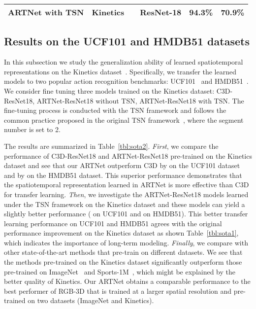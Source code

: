 \documentclass[10pt,twocolumn,letterpaper]{article}
\begin{document}
\begin{table*}
{\begin{tabular}{|l|c|c|c|c|c|}
    \hline
    ARTNet with TSN & Kinetics &  & ResNet-18 & {\bf 94.3\%} & {\bf 70.9\%} \\
    \hline
  \end{tabular}
}
\vspace{1mm}
\caption{Comparison with state-of-the-art methods on the UCF101 and HMDB51 datasets. The accuracy is reported as average over three splits. {\bf For fair comparison, we consider methods that use only RGB input and pre-train on different datasets}. The performance is grouped according to its pre-training dataset. Our ARTNet obtains the best performance under the setting of pre-training only on the Kinetics dataset, and a comparable performance to the RGB-I3D pre-trained on the datasets of ImageNet+Kinetics.}
\label{tbl:sota2}
\vspace{-4mm}
\end{table*}

\subsection{Results on the UCF101 and HMDB51 datasets}

In this subsection we study the generalization ability of learned spatiotemporal representations on the Kinetics dataset~\cite{KayCSZHVVGBNSZ17}. Specifically, we transfer the learned models to two popular action recognition benchmarks: UCF101~\cite{Soomro12} and HMDB51~\cite{KuehneJGPS11}. We consider fine tuning three models trained on the Kinetics dataset: C3D-ResNet18, ARTNet-ResNet18 without TSN, ARTNet-ResNet18 with TSN. The fine-tuning process is conducted with the TSN framework and follows the common practice proposed in the original TSN framework~\cite{WangXWQLTV16}, where the segment number is set to 2.

The results are summarized in Table~\ref{tbl:sota2}. {\em First}, we compare the performance of C3D-ResNet18 and ARTNet-ResNet18 pre-trained on the Kinetics dataset and see that our ARTNet outperform C3D by  on the UCF101 dataset and by  on the HMDB51 dataset. This superior performance demonstrates that the spatiotemporal representation learned in ARTNet is more effective than C3D for transfer learning. {\em Then}, we investigate the ARTNet-ResNet18 models learned under the TSN framework on the Kinetics dataset and these models can yield a slightly better performance ( on UCF101 and  on HMDB51). This better transfer learning performance on UCF101 and HMDB51 agrees with the original performance improvement on the Kinetics dataset as shown Table~\ref{tbl:sota1}, which indicates the importance of long-term modeling. {\em Finally}, we compare with other state-of-the-art methods that pre-train on different datasets. We see that the methods pre-trained on the Kinetics dataset significantly outperform those pre-trained on  ImageNet~\cite{DengDSLL009} and Sports-1M~\cite{KarpathyTSLSF14}, which might be explained by the better quality of Kinetics. Our ARTNet obtains a comparable performance to the best performer of RGB-3D that is trained at a larger spatial resolution and pre-trained on two datasets (ImageNet and Kinetics).
\end{document}
